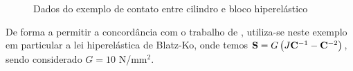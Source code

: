 \documentclass[Tese.tex]{subfiles}
\begin{document}
\begin{figure}[!htb]
	\centering
	\caption{Dados do exemplo de contato entre cilindro e bloco hiperelástico}
\label{fig:exemploContato}
	{\small
		\noindent{}
	}	
\end{figure}

De forma a permitir a concordância com o trabalho de , utiliza-se neste exemplo em particular a lei hiperelástica de Blatz-Ko, onde temos $\mathbf{S} = G\left(J\mathbf{C}^{-1}-\mathbf{C}^{-2}\right)$, sendo considerado $G = 10$ N/mm$^2$.
\end{document}
